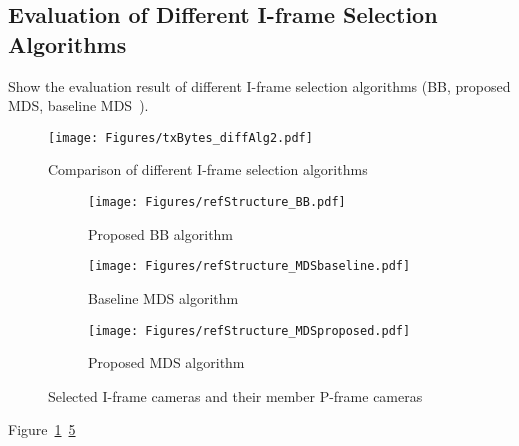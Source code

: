 \subsection{Evaluation of Different I-frame Selection Algorithms}
{\color{red}Show the evaluation result of different I-frame selection algorithms (BB, proposed MDS, baseline MDS~\cite{MWDS_baseline}).}
%
\begin{figure}
\begin{center}
\texttt{[image: Figures/txBytes\_diffAlg2.pdf]}
\caption{\label{fig::txBytes_diffAlg} Comparison of different I-frame selection algorithms}
\end{center}
\end{figure}
%
\begin{figure}
\begin{center}
%
\begin{subfigure}[b]{\columnwidth}
\texttt{[image: Figures/refStructure\_BB.pdf]}
\caption{\label{fig::refStructure_BB} Proposed BB algorithm}
\end{subfigure}
%
\begin{subfigure}[b]{\columnwidth}
\texttt{[image: Figures/refStructure\_MDSbaseline.pdf]}
\caption{\label{fig::refStructure_MDSbaseline} Baseline MDS algorithm}
\end{subfigure}
%
\begin{subfigure}[b]{\columnwidth}
\texttt{[image: Figures/refStructure\_MDSproposed.pdf]}
\caption{\label{fig::refStructure_MDSproposed} Proposed MDS algorithm}
\end{subfigure}
%
\caption{\label{fig::refStructure_threeAlgs} Selected I-frame cameras and their member P-frame cameras}
\end{center}
\end{figure}
Figure~\ref{fig::txBytes_diffAlg}~\ref{fig::refStructure_threeAlgs}

%

